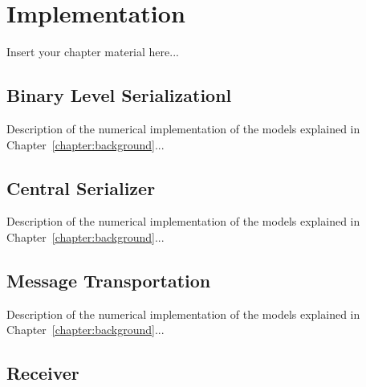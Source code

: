 

\chapter{Implementation}
\label{chapter:implementation}

Insert your chapter material here...

\section{Binary Level Serializationl}
\label{section:binaryLevelSerialization}

Description of the numerical implementation of the models explained in Chapter~\ref{chapter:background}...


\section{Central Serializer}
\label{section:centralSerializer}

Description of the numerical implementation of the models explained in Chapter~\ref{chapter:background}...


\section{Message Transportation}
\label{section:messageTransfer}

Description of the numerical implementation of the models explained in Chapter~\ref{chapter:background}...



\section{Receiver}
\label{section:receiver}

